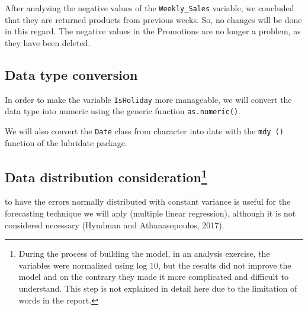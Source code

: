 \documentclass[11pt,]{article}
\newenvironment{Shaded}{\begin{snugshade}}{\end{snugshade}}
\newcommand{\KeywordTok}[1]{\textcolor[rgb]{0.13,0.29,0.53}{\textbf{{#1}}}}
\newcommand{\StringTok}[1]{\textcolor[rgb]{0.31,0.60,0.02}{{#1}}}
\newcommand{\CommentTok}[1]{\textcolor[rgb]{0.56,0.35,0.01}{\textit{{#1}}}}
\newcommand{\NormalTok}[1]{{#1}}
\let\rmarkdownfootnote\footnote%
\def\footnote{\protect\rmarkdownfootnote}
\begin{document}
After analyzing the negative values of the \texttt{Weekly\_Sales}
variable, we concluded that they are returned products from previous
weeks. So, no changes will be done in this regard. The negative values
in the Promotions are no longer a problem, as they have been deleted.

\subsection{Data type conversion}\label{data-type-conversion}

In order to make the variable \texttt{IsHoliday} more manageable, we
will convert the data type into numeric using the generic function
\texttt{as.numeric()}.

\begin{Shaded}
\end{Shaded}

We will also convert the \texttt{Date} class from character into date
with the \texttt{mdy\ ()} function of the lubridate package.

\begin{Shaded}
\end{Shaded}

\subsection[Data distribution consideration]{\texorpdfstring{Data
distribution consideration\footnote{During the process of building the
  model, in an analysis exercise, the variables were normalized using
  log 10, but the results did not improve the model and on the contrary
  they made it more complicated and difficult to understand. This step
  is not explained in detail here due to the limitation of words in the
  report.}}{Data distribution consideration}}\label{data-distribution-consideration}

to have the errors normally distributed with constant variance is useful
for the forecasting technique we will aply (multiple linear regression),
although it is not considered necessary (Hyndman and Athana­sopou­los,
2017).
\end{document}
